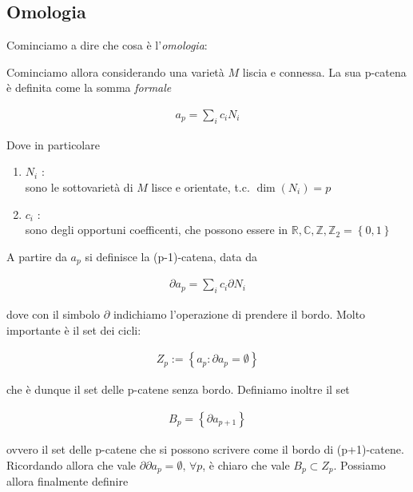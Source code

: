 \documentclass{report}
\begin{document}
\subsection{Omologia}

Cominciamo a dire che cosa è l'\emph{omologia}: 


Cominciamo allora considerando una varietà \(M\) liscia e connessa. La sua p-catena è definita come la somma \emph{formale}

\begin{align}
    a_p = \sum_i c_iN_i 
\end{align}

Dove in particolare

\begin{enumerate}
    \item \(N_i\) : \\
    sono le sottovarietà di \(M\) lisce e orientate, t.c. \(\dim (N_i)=p\)
    \item \(c_i\) : \\
    sono degli opportuni coefficenti, che possono essere in \(\mathbb{R}, \mathbb{C}, \mathbb{Z}, \mathbb{Z}_2 = \left\{0, 1 \right\}\)
\end{enumerate}

A partire da \(a_p\) si definisce la (p-1)-catena, data da 

\begin{align}
    \partial a_p = \sum_i c_i \partial N_i
\end{align}

dove con il simbolo \(\partial\) indichiamo l'operazione di prendere il bordo. Molto importante è il set dei cicli: 

\begin{align}
    Z_p := \left\{a_p : \partial a_p = \emptyset \right\}
\end{align}

che è dunque il set delle p-catene senza bordo. Definiamo inoltre il set 

\begin{align}
    B_p = \left\{\partial a_{p+1}\right\}
\end{align}

ovvero il set delle p-catene che si possono scrivere come il bordo di (p+1)-catene. Ricordando allora che vale \(\partial \partial a_p = \emptyset, \, \forall p\), è chiaro che vale \(B_p \subset Z_p\). Possiamo allora finalmente definire 
\end{document}
